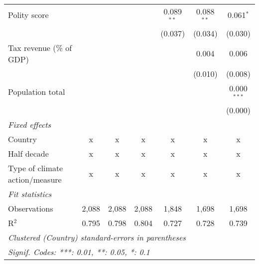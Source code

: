 \begin{tabular}{lcccccc}
   Polity score                                                      &         &              &                & 0.089$^{**}$   & 0.088$^{**}$  & 0.061$^{*}$\\   
                                                                     &         &              &                & (0.037)        & (0.034)       & (0.030)\\   
   Tax revenue (\% of GDP)                                           &         &              &                &                & 0.004         & 0.006\\   
                                                                     &         &              &                &                & (0.010)       & (0.008)\\   
   Population total                                                  &         &              &                &                &               & 0.000$^{***}$\\   
                                                                     &         &              &                &                &               & (0.000)\\   
   \emph{Fixed effects}\\
   Country                                                           & x       & x            & x              & x              & x             & x\\  
   Half decade                                                       & x       & x            & x              & x              & x             & x\\  
   Type of climate action/measure                                    & x       & x            & x              & x              & x             & x\\  
   \midrule \emph{Fit statistics}\\
   Observations                                                      & 2,088   & 2,088        & 2,088          & 1,848          & 1,698         & 1,698\\  
   R$^2$                                                             & 0.795   & 0.798        & 0.804          & 0.727          & 0.728         & 0.739\\  
   \midrule
   \multicolumn{7}{l}{\emph{Clustered (Country) standard-errors in parentheses}}\\
   \multicolumn{7}{l}{\emph{Signif. Codes: ***: 0.01, **: 0.05, *: 0.1}}\\
\end{tabular}
\par\endgroup


